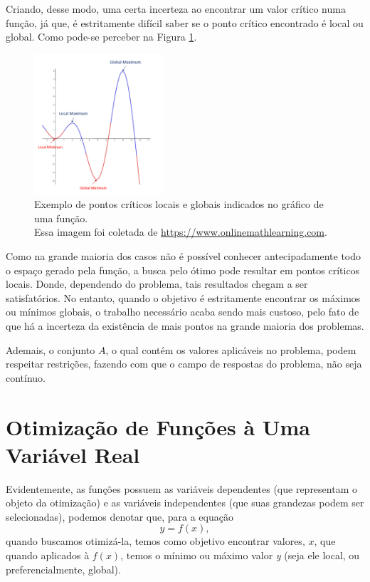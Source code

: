 Criando, desse modo, uma certa incerteza ao encontrar um valor crítico numa
função, já que, é estritamente difícil saber se o ponto crítico encontrado é
local ou global. Como pode-se perceber na Figura
\ref{grafico_local_global_pontosCriticos}.

\begin{figure}[h]
    \centering
    \includegraphics[width=0.43\textwidth]{src/grafico_local_global_pontosCriticos.png}
    \captionsetup{justification=centering}
    \caption{
      Exemplo de pontos críticos locais e globais indicados no gráfico de uma função.\\
      \tiny Essa imagem foi coletada de \url{https://www.onlinemathlearning.com}.
    }
    \label{grafico_local_global_pontosCriticos}
\end{figure}

Como na grande maioria dos casos não é possível conhecer antecipadamente todo
o espaço gerado pela função, a busca pelo ótimo pode resultar em pontos
críticos locais. Donde, dependendo do problema, tais resultados chegam a ser
satisfatórios. No entanto, quando o objetivo é estritamente encontrar os máximos
ou mínimos globais, o trabalho necessário acaba sendo mais custoso, pelo fato de
que há a incerteza da existência de mais pontos na grande maioria dos problemas.

Ademais, o conjunto $A$, o qual contém os valores aplicáveis no problema, podem
respeitar restrições, fazendo com que o campo de respostas do problema, não seja
contínuo.

\section{{Otimização de Funções à Uma Variável Real}}\label{otim_uma_var}

\hspace{0.8cm}

Evidentemente, as funções possuem as variáveis dependentes (que representam o
objeto da otimização) e as variáveis independentes (que suas grandezas podem
ser selecionadas), podemos denotar que, para a equação
\begin{equation}
    y = f(x),
\end{equation}
quando buscamos otimizá-la, temos como objetivo encontrar valores, \(x\), que
quando aplicados à \(f(x)\), temos o mínimo ou máximo valor \textit{y} (seja
ele local, ou preferencialmente, global).

